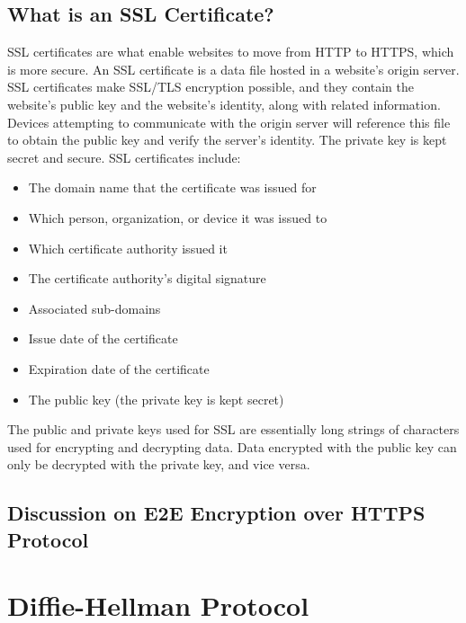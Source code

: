 \subsection{What is an SSL Certificate?}\label{subsec:what-is-an-ssl-certificate?}
SSL certificates are what enable websites to move from HTTP to HTTPS, which is more secure.
An SSL certificate is a data file hosted in a website's origin server.
SSL certificates make SSL/TLS encryption possible, and they contain the website's public key and the website's identity,
along with related information.
Devices attempting to communicate with the origin server will reference this file to obtain the public key and verify
the server's identity.
The private key is kept secret and secure.
SSL certificates include:
\begin{itemize}
    \item The domain name that the certificate was issued for
    \item Which person, organization, or device it was issued to
    \item Which certificate authority issued it
    \item The certificate authority's digital signature
    \item Associated sub-domains
    \item Issue date of the certificate
    \item Expiration date of the certificate
    \item The public key (the private key is kept secret)
\end{itemize}
The public and private keys used for SSL are essentially long strings of characters used for encrypting and decrypting data.
Data encrypted with the public key can only be decrypted with the private key, and vice versa.

\subsection{Discussion on E2E Encryption over HTTPS Protocol}\label{subsec:discussion-on-e2e-encryption-over-https-protocol}


\section{Diffie-Hellman Protocol}\label{sec:diffie-hellman-protocol}
